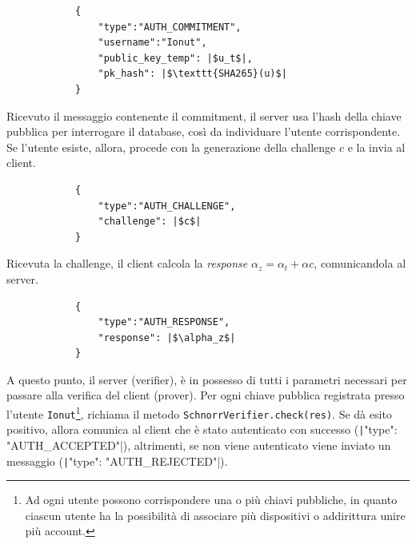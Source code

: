 \begin{itemize}
{		\begin{center}
			\begin{verbatim}
            {
                "type":"AUTH_COMMITMENT",
                "username":"Ionut",
                "public_key_temp": |$u_t$|,
                "pk_hash": |$\texttt{SHA265}(u)$|
            }
			\end{verbatim}
		\end{center}
		Ricevuto il messaggio contenente il commitment, il server usa l'hash della chiave pubblica per interrogare il database, così da individuare l'utente corrispondente. Se l'utente esiste, allora, procede con la generazione della challenge $c$ e la invia al client.
		\begin{center}
			\begin{verbatim}
            {
                "type":"AUTH_CHALLENGE",
                "challenge": |$c$|
            }
			\end{verbatim}
		\end{center}
		Ricevuta la challenge, il client calcola la \textit{response} $\alpha_z = \alpha_t + \alpha c$, comunicandola al server.
		\begin{center}
			\begin{verbatim}
            {
                "type":"AUTH_RESPONSE",
                "response": |$\alpha_z$|
            }
			\end{verbatim}
		\end{center}
		A questo punto, il server (verifier), è in possesso di tutti i parametri necessari per passare alla verifica del client (prover). Per ogni chiave pubblica registrata presso l'utente \texttt{Ionut}\footnote{Ad ogni utente possono corrispondere una o più chiavi pubbliche, in quanto ciascun utente ha la possibilità di associare più dispositivi o addirittura unire più account.}, richiama il metodo \texttt{SchnorrVerifier.check(res)}. Se dà esito positivo, allora comunica al client che è stato autenticato con successo (\texttt|{"type": "AUTH_ACCEPTED"}|), altrimenti, se non viene autenticato viene inviato un messaggio (\texttt|{"type": "AUTH_REJECTED"}|).
	}
\end{itemize}

